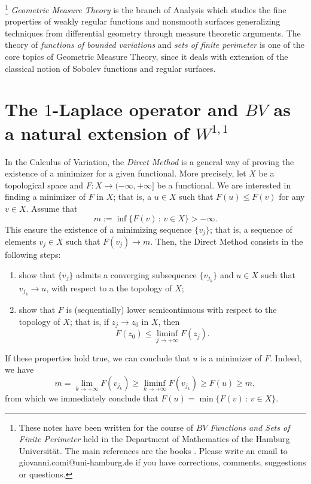 \footnote{These notes have been written for the course of {\em $BV$ Functions and Sets of Finite Perimeter} held in the Department of Mathematics of the Hamburg Universität. The main references are the books \cite{AFP, evans2015measure, maggi2012sets}. Please write an email to giovanni.comi@uni-hamburg.de if you have corrections, comments, suggestions or questions.} 
{\em Geometric Measure Theory} is the branch of Analysis which studies the fine properties of weakly regular functions and nonsmooth surfaces generalizing techniques from differential geometry through measure theoretic arguments. The theory of {\em functions of bounded variations} and {\em sets of finite perimeter} is one of the core topics of Geometric Measure Theory, since it deals with extension of the classical notion of Sobolev functions and regular surfaces.

\section*{The $1$-Laplace operator and $BV$ as a natural extension of $W^{1, 1}$}

In the Calculus of Variation, the {\em Direct Method} is a general way of proving the existence of a minimizer for a given functional. More precisely, let $X$ be a topological space and $F : X \to ( - \infty, + \infty]$ be a functional. We are interested in finding a minimizer of $F$ in $X$; that is, a $u \in X$ such that $F(u) \le F(v)$ for any $v \in X$. Assume that
\begin{equation*}
m := \inf \{ F(v) \, : \, v \in X\} > - \infty.
\end{equation*}
This ensure the existence of a minimizing sequence $\{v_{j}\}$; that is, a sequence of elements $v_{j} \in X$ such that $F(v_{j}) \to m$. Then, the Direct Method consists in the following steps:
\begin{enumerate}[(1)]
\item show that $\{v_{j}\}$ admits a converging subsequence $\{v_{j_{k}}\}$ and $u \in X$ such that $v_{j_{k}} \to u$, with respect to a the topology of $X$;
\item show that $F$ is (sequentially) lower semicontinuous with respect to the topology of $X$; that is, if $z_{j} \to z_{0}$ in $X$, then
$$ F(z_{0}) \le \liminf_{j \to + \infty} F(z_{j}).$$
\end{enumerate} 
If these properties hold true, we can conclude that $u$ is a minimizer of $F$. Indeed, we have
\begin{equation*}
m = \lim_{k \to + \infty} F(v_{j_{k}}) \ge \liminf_{k \to + \infty} F(v_{j_{k}}) \ge F(u) \ge m,
\end{equation*}
from which we immediately conclude that $F(u) = \min \{ F(v) \, : \, v \in X \}$.


